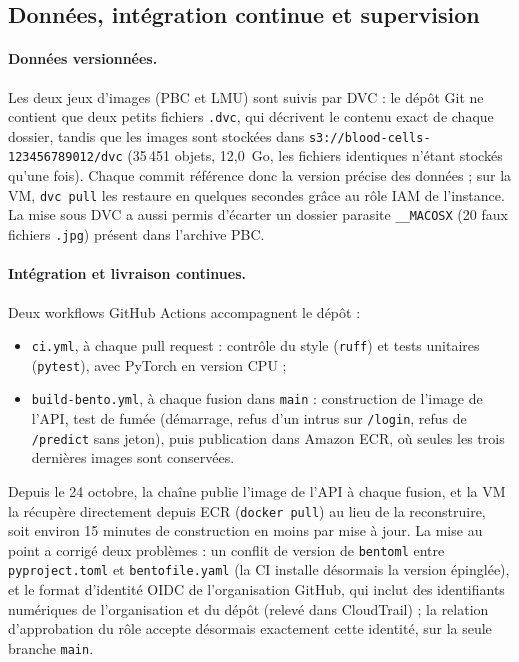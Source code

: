 \subsection{Données, intégration continue et supervision}

\paragraph{Données versionnées.} Les deux jeux d'images (PBC et LMU) sont suivis par
DVC : le dépôt Git ne contient que deux petits fichiers \texttt{.dvc}, qui décrivent
le contenu exact de chaque dossier, tandis que les images sont stockées dans
\texttt{s3://blood-cells-123456789012/dvc} (35\,451 objets, 12,0~Go, les fichiers
identiques n'étant stockés qu'une fois). Chaque commit référence donc la version
précise des données ; sur la VM, \texttt{dvc pull} les restaure en quelques secondes
grâce au rôle IAM de l'instance. La mise sous DVC a aussi permis d'écarter un dossier
parasite \texttt{\_\_MACOSX} (20 faux fichiers \texttt{.jpg}) présent dans l'archive PBC.

\paragraph{Intégration et livraison continues.} Deux workflows GitHub Actions
accompagnent le dépôt :
\begin{itemize}[leftmargin=*]
  \item \texttt{ci.yml}, à chaque pull request : contrôle du style (\texttt{ruff})
        et tests unitaires (\texttt{pytest}), avec PyTorch en version CPU ;
  \item \texttt{build-bento.yml}, à chaque fusion dans \texttt{main} : construction
        de l'image de l'API, test de fumée (démarrage, refus d'un intrus sur
        \texttt{/login}, refus de \texttt{/predict} sans jeton), puis publication
        dans Amazon ECR, où seules les trois dernières images sont conservées.
\end{itemize}

Depuis le 24 octobre, la chaîne publie l'image de l'API à chaque fusion, et la VM la
récupère directement depuis ECR (\texttt{docker pull}) au lieu de la reconstruire, soit
environ 15 minutes de construction en moins par mise à jour. La mise au point a corrigé
deux problèmes : un conflit de version de \texttt{bentoml} entre \texttt{pyproject.toml} et
\texttt{bentofile.yaml} (la CI installe désormais la version épinglée), et le format d'identité OIDC de l'organisation GitHub, qui inclut des identifiants
numériques de l'organisation et du dépôt (relevé dans CloudTrail) ; la relation
d'approbation du rôle accepte désormais exactement cette identité, sur la seule
branche \texttt{main}.

